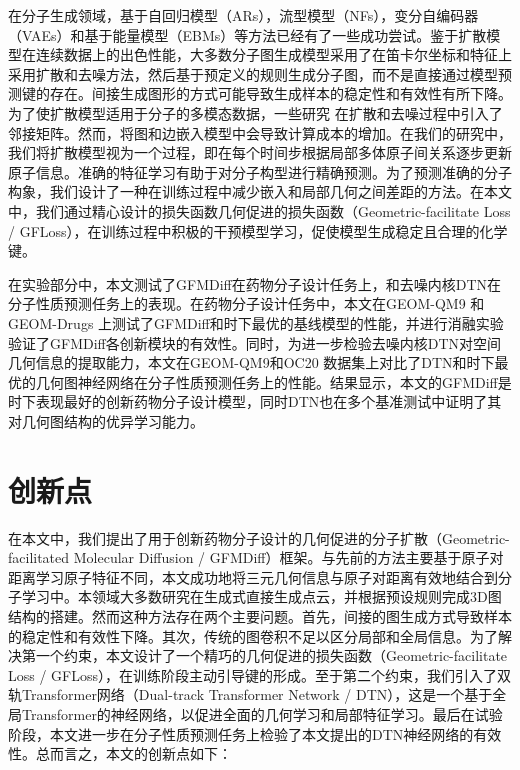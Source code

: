 在分子生成领域，基于自回归模型（ARs）\cite{gschnet_wallach_19,gshperenet_luo_22}，流型模型（NFs）\cite{moflow_zang_20,graphaf_shi_20}，变分自编码器（VAEs）\cite{jtvae_jin_18,cgvae_liu_18}和基于能量模型（EBMs）\cite{graphebm_liu_21}等方法已经有了一些成功尝试。鉴于扩散模型在连续数据上的出色性能，大多数分子图生成模型采用了在笛卡尔坐标和特征上采用扩散和去噪方法，然后基于预定义的规则生成分子图，而不是直接通过模型预测键的存在。间接生成图形的方式可能导致生成样本的稳定性和有效性有所下降。为了使扩散模型适用于分子的多模态数据，一些研究 \cite{edpgnn_niu_20,digress_vignac_22,midi_vignac_23}在扩散和去噪过程中引入了邻接矩阵。然而，将图和边嵌入模型中会导致计算成本的增加。在我们的研究中，我们将扩散模型视为一个过程，即在每个时间步根据局部多体原子间关系逐步更新原子信息。准确的特征学习有助于对分子构型进行精确预测。为了预测准确的分子构象，我们设计了一种在训练过程中减少嵌入和局部几何之间差距的方法。在本文中，我们通过精心设计的损失函数几何促进的损失函数（Geometric-facilitate Loss / GFLoss），在训练过程中积极的干预模型学习，促使模型生成稳定且合理的化学键。

在实验部分中，本文测试了GFMDiff在药物分子设计任务上，和去噪内核DTN在分子性质预测任务上的表现。在药物分子设计任务中，本文在GEOM-QM9 \cite{qm9_ramakrishnan_14}和GEOM-Drugs \cite{drugs_axelrod_22}上测试了GFMDiff和时下最优的基线模型的性能，并进行消融实验验证了GFMDiff各创新模块的有效性。同时，为进一步检验去噪内核DTN对空间几何信息的提取能力，本文在GEOM-QM9和OC20 \cite{oc20_chanussot_21}数据集上对比了DTN和时下最优的几何图神经网络在分子性质预测任务上的性能。结果显示，本文的GFMDiff是时下表现最好的创新药物分子设计模型，同时DTN也在多个基准测试中证明了其对几何图结构的优异学习能力。

\section{创新点}
在本文中，我们提出了用于创新药物分子设计的几何促进的分子扩散（Geometric-facilitated Molecular Diffusion / GFMDiff）框架。与先前的方法主要基于原子对距离学习原子特征不同，本文成功地将三元几何信息与原子对距离有效地结合到分子学习中。本领域大多数研究在生成式直接生成点云，并根据预设规则完成3D图结构的搭建。然而这种方法存在两个主要问题。首先，间接的图生成方式导致样本的稳定性和有效性下降。其次，传统的图卷积不足以区分局部和全局信息。为了解决第一个约束，本文设计了一个精巧的几何促进的损失函数（Geometric-facilitate Loss / GFLoss），在训练阶段主动引导键的形成。至于第二个约束，我们引入了双轨Transformer网络（Dual-track Transformer Network / DTN），这是一个基于全局Transformer的神经网络，以促进全面的几何学习和局部特征学习。最后在试验阶段，本文进一步在分子性质预测任务上检验了本文提出的DTN神经网络的有效性。总而言之，本文的创新点如下：

